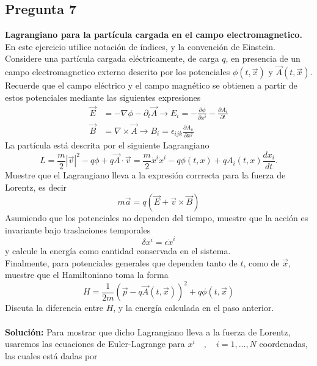 \documentclass[../main.tex]{subfiles}
\begin{document}
\subsection{Pregunta 7}
\textbf{Lagrangiano para la partícula cargada en el campo electromagnetico.} En este ejercicio utilice notación de índices, y la convención de Einstein. Considere una partícula cargada eléctricamente, de carga $q$, en presencia de un campo electromagnetico externo descrito por los potenciales $\phi(t,\vec{x})$ y $\vec{A}(t,\vec{x})$. Recuerde que el campo eléctrico y el campo magnético se obtienen a partir de estos potenciales mediante las siguientes expresiones
\begin{align*}
  \vec{E} & =-\nabla \phi - \partial_t\vec{A} \rightarrow E_i = -\frac{\partial \phi}{\partial x^i} - \frac{\partial A_i}{\partial t} \\
  \vec{B} & = \nabla \times \vec{A} \rightarrow B_i = \epsilon_{ijk}\frac{\partial A_k}{\partial x^j}
\end{align*}
La partícula está descrita por el siguiente Lagrangiano
\begin{equation*}
  L=\frac{m}{2}|\vec{v}|^2 - q\phi + q\vec{A}\cdot \vec{v} = \frac{m}{2}\dot{x}^i\dot{x}^i - q\phi(t,x) + qA_i(t,x) \frac{dx_i}{dt}.
\end{equation*}
Muestre que el Lagrangiano lleva a la expresión corrrecta para la fuerza de Lorentz, es decir
\begin{equation}
  m\vec{a}=q(\vec{E}+\vec{v}\times\vec{B})
\end{equation}
Asumiendo que los potenciales no dependen del tiempo, muestre que la acción es invariante bajo traslaciones temporales
\begin{equation}
  \delta x^i=\epsilon \dot{x}^i 
\end{equation}
y calcule la energía como cantidad conservada en el sistema. \\
Finalmente, para potenciales generales que dependen tanto de $t$, como de $\vec{x}$, muestre que el Hamiltoniano toma la forma
\begin{equation}
  H=\frac{1}{2m}\left( \vec{p}-q\vec{A}(t,\vec{x}) \right)^2 + q\phi(t,\vec{x})
\end{equation}
Discuta la diferencia entre $H$, y la energía calculada en el paso anterior. 
\\
\\
\textbf{Solución:}
Para mostrar que dicho Lagrangiano lleva a la fuerza de Lorentz, usaremos las ecuaciones de Euler-Lagrange para $x^i \quad , \quad i=1,\dots,N$ coordenadas, las cuales está dadas por
\end{document}
